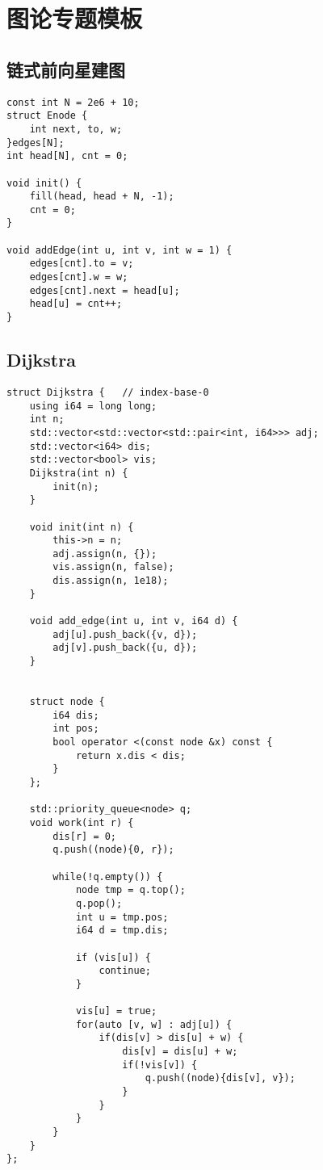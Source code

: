 \section{图论专题模板}
\subsection{链式前向星建图}
\begin{lstlisting}
const int N = 2e6 + 10;
struct Enode {
    int next, to, w;
}edges[N];
int head[N], cnt = 0;

void init() {
    fill(head, head + N, -1);
    cnt = 0;
}

void addEdge(int u, int v, int w = 1) {
    edges[cnt].to = v;
    edges[cnt].w = w;
    edges[cnt].next = head[u];
    head[u] = cnt++;
}
\end{lstlisting}

\subsection{Dijkstra}
\begin{lstlisting}
struct Dijkstra {   // index-base-0
    using i64 = long long;
    int n;
    std::vector<std::vector<std::pair<int, i64>>> adj;
    std::vector<i64> dis;
    std::vector<bool> vis;
    Dijkstra(int n) {
        init(n);
    }

    void init(int n) {
        this->n = n;
        adj.assign(n, {});
        vis.assign(n, false);
        dis.assign(n, 1e18);
    }
 
    void add_edge(int u, int v, i64 d) {
        adj[u].push_back({v, d});
        adj[v].push_back({u, d});
    }
 

    struct node {
        i64 dis;
        int pos;
        bool operator <(const node &x) const {
            return x.dis < dis;
        }
    };
 
    std::priority_queue<node> q;
    void work(int r) {
        dis[r] = 0;
        q.push((node){0, r});
 
        while(!q.empty()) {
            node tmp = q.top();
            q.pop();
            int u = tmp.pos;
            i64 d = tmp.dis;
 
            if (vis[u]) {
                continue;
            }
 
            vis[u] = true;
            for(auto [v, w] : adj[u]) {
                if(dis[v] > dis[u] + w) {
                    dis[v] = dis[u] + w;
                    if(!vis[v]) {
                        q.push((node){dis[v], v});
                    }
                }
            }
        }
    }
};
\end{lstlisting}

